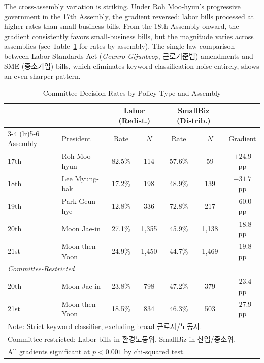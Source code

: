 \documentclass[11pt]{article}
\begin{document}
The cross-assembly variation is striking. Under Roh Moo-hyun's progressive government in the 17th Assembly, the gradient reversed: labor bills processed at higher rates than small-business bills. From the 18th Assembly onward, the gradient consistently favors small-business bills, but the magnitude varies across assemblies (see Table~\ref{tab:rates} for rates by assembly). The single-law comparison between Labor Standards Act (\textit{Geunro Gijunbeop}, 근로기준법) amendments and SME (중소기업) bills, which eliminates keyword classification noise entirely, shows an even sharper pattern.

\begin{table}[H]
\centering
\caption{Committee Decision Rates by Policy Type and Assembly}
\label{tab:rates}
\begin{tabular}{llccccc}
\toprule
 & & \multicolumn{2}{c}{Labor (Redist.)} & \multicolumn{2}{c}{SmallBiz (Distrib.)} & \\
\cmidrule(lr){3-4} \cmidrule(lr){5-6}
Assembly & President & Rate & $N$ & Rate & $N$ & Gradient \\
\midrule
17th & Roh Moo-hyun        & 82.5\% & 114   & 57.6\% & 59    & $+24.9$ pp \\
18th & Lee Myung-bak       & 17.2\% & 198   & 48.9\% & 139   & $-31.7$ pp \\
19th & Park Geun-hye       & 12.8\% & 336   & 72.8\% & 217   & $-60.0$ pp \\
20th & Moon Jae-in         & 27.1\% & 1,355 & 45.9\% & 1,138 & $-18.8$ pp \\
21st & Moon then Yoon      & 24.9\% & 1,450 & 44.7\% & 1,469 & $-19.8$ pp \\
\midrule
\multicolumn{2}{l}{\textit{Committee-Restricted}} & & & & & \\
20th & Moon Jae-in         & 23.8\% & 798   & 47.2\% & 379   & $-23.4$ pp \\
21st & Moon then Yoon      & 18.5\% & 834   & 46.3\% & 503   & $-27.9$ pp \\
\bottomrule
\multicolumn{7}{l}{\footnotesize Note: Strict keyword classifier, excluding broad 근로자/노동자.} \\
\multicolumn{7}{l}{\footnotesize Committee-restricted: Labor bills in 환경노동위, SmallBiz in 산업/중소위.} \\
\multicolumn{7}{l}{\footnotesize All gradients significant at $p < 0.001$ by chi-squared test.} \\
\end{tabular}
\end{table}
\end{document}
